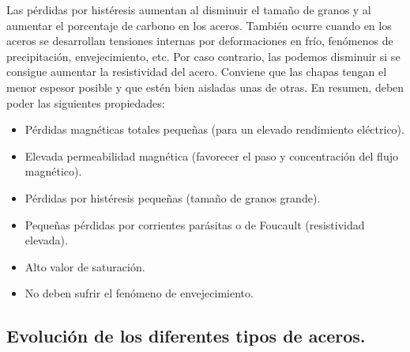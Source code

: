 \documentclass[12pt,a4paper]{article}
\begin{document}
Las pérdidas por histéresis aumentan al disminuir el tamaño de granos y al aumentar el porcentaje de carbono en los aceros. También ocurre cuando en los aceros se desarrollan tensiones internas por deformaciones en frío, fenómenos de precipitación, envejecimiento, etc. Por caso contrario, las podemos disminuir si se consigue aumentar la resistividad del acero. Conviene que las chapas tengan el menor espesor posible y que estén bien aisladas unas de otras.
En resumen, deben poder las siguientes propiedades:

\begin{itemize}
    \item Pérdidas magnéticas totales pequeñas (para un elevado rendimiento eléctrico).
    \item Elevada permeabilidad magnética (favorecer el paso y concentración del flujo magnético).
    \item Pérdidas por histéresis pequeñas (tamaño de granos grande).
    \item Pequeñas pérdidas por corrientes parásitas o de Foucault (resistividad elevada).
    \item Alto valor de saturación.
    \item No deben sufrir el fenómeno de envejecimiento.
\end{itemize}

\subsection{Evolución de los diferentes tipos de aceros.}
\end{document}
